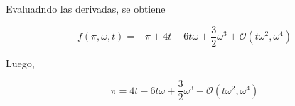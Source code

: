 \documentclass[10pt]{article}
\begin{document}
Evaluadndo las derivadas, se obtiene

\begin{equation}
f(\pi, \omega, t) = -\pi + 4t -6t\omega +\dfrac{3}{2}\omega^3 + \mathcal{O}(t\omega^2, \omega^4)
\end{equation}

Luego,

\begin{equation}
\pi = 4t -6t\omega +\dfrac{3}{2}\omega^3  + \mathcal{O}(t\omega^2, \omega^4)
\end{equation}
\end{document}
